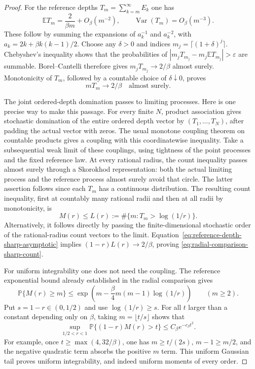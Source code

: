 \documentclass[11pt,a4paper]{article}
\numberwithin{equation}{section}
\theoremstyle{definition}
\theoremstyle{remark}
\begin{document}
\begin{proof}
For the reference depths $T_m=\sum_{k=m}^\infty E_k$ one has
\[
 \mathbb E T_m=\frac2{\beta m}+O_\beta(m^{-2}),\qquad
 \operatorname{Var}(T_m)=O_\beta(m^{-3}).
\]
These follow by summing the expansions of $a_k^{-1}$ and
$a_k^{-2}$, with $a_k=2k+\beta k(k-1)/2$.
Choose any $\delta>0$ and indices $m_j=\lceil(1+\delta)^j\rceil$.
Chebyshev's inequality shows that the probabilities of
$|m_jT_{m_j}-m_j\mathbb ET_{m_j}|>\varepsilon$ are summable.
Borel--Cantelli therefore gives $m_jT_{m_j}\to2/\beta$ almost
surely. Monotonicity of $T_m$, followed by a countable choice of
$\delta\downarrow0$, proves
\begin{equation}
 mT_m\longrightarrow2/\beta\quad\text{almost surely}.
 \label{eq:reference-depth-sharp-asymptotic}
\end{equation}

The joint ordered-depth domination passes to limiting processes.
Here is one precise way to make this passage. For every finite
$N$, product association gives stochastic domination of the entire
ordered depth vector by $(T_1,\ldots,T_N)$, after padding the
actual vector with zeros. The usual monotone coupling theorem on
countable products gives a coupling with this coordinatewise
inequality. Take a subsequential weak limit of these couplings,
using tightness of the point processes and the fixed reference
law. At every rational radius, the count inequality passes almost
surely through a Skorokhod representation: both the actual limiting
process and the reference process almost surely avoid that circle.
The latter assertion follows since each $T_m$ has a continuous
distribution. The resulting count inequality, first at countably
many rational radii and then at all radii by monotonicity, is
\[
 M(r)\le L(r):=\#\{m:T_m>\log(1/r)\}.
\]
Alternatively, it follows directly by passing the finite-dimensional
stochastic order of the rational-radius count vectors to the limit.
Equation~\eqref{eq:reference-depth-sharp-asymptotic} implies
$(1-r)L(r)\to2/\beta$, proving
\eqref{eq:radial-comparison-sharp-count}.

For uniform integrability one does not need the coupling. The
reference exponential bound already established in the radial
comparison gives
\[
 \mathbb P\{M(r)\ge m\}
 \le\exp\left(m-\frac\beta4m(m-1)\log(1/r)\right)
 \qquad(m\ge2).
\]
Put $s=1-r\in(0,1/2)$ and use $\log(1/r)\ge s$. For all
$t$ larger than a constant depending only on $\beta$, taking
$m=\lfloor t/s\rfloor$ shows that
\[
 \sup_{1/2<r<1}\mathbb P\{(1-r)M(r)>t\}
 \le C_\beta e^{-c_\beta t^2}.
\]
For example, once $t\ge\max(4,32/\beta)$, one has
$m\ge t/(2s)$, $m-1\ge m/2$, and the negative quadratic term
absorbs the positive $m$ term. This uniform Gaussian tail proves
uniform integrability, and indeed uniform moments of every order.
\end{proof}
\end{document}
